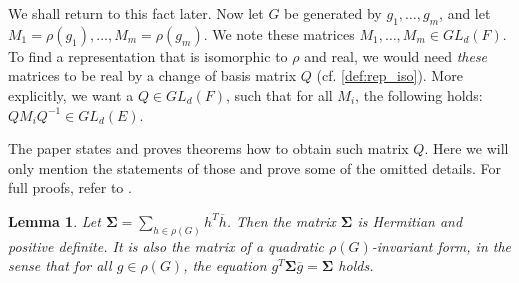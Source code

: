 \documentclass[11pt]{article}
\newtheorem{lemma}[theorem]{Lemma}
\begin{document}
We shall return to this fact later. Now let $G$ be generated by
$g_1, \ldots, g_m$, and let $M_1 = \rho(g_1), \ldots, M_m = \rho(g_m)$.
We note these matrices $M_1, \ldots, M_m \in GL_d(F)$. To find a representation
that is isomorphic to $\rho$ and real, we would need \textit{these} matrices to
be real by a change of basis matrix $Q$ (cf. \cref{def:rep_iso}). More explicitly,
we want a $Q \in GL_d(F)$, such that for all $M_i$, the following holds:
$QM_iQ^{-1} \in GL_d(E)$.

The paper \cite{Pas21} states and proves theorems how to obtain such matrix $Q$.
Here we will only mention the statements of those and prove some of the omitted
details. For full proofs, refer to \cite[Lemma 3.1, Lemma 3.2]{Pas21}.
\begin{lemma}
  Let $\mathbf{\Sigma} = \sum_{h \in \rho(G)} h^T\overline{h}$. Then the matrix
  $\mathbf{\Sigma}$ is Hermitian and positive definite. It is also the matrix of
  a quadratic $\rho(G)$-invariant form, in the sense that for all $g \in \rho(G)$,
  the equation $g^T\mathbf{\Sigma}\overline{g} = \mathbf{\Sigma}$ holds.
\end{lemma}
\end{document}
